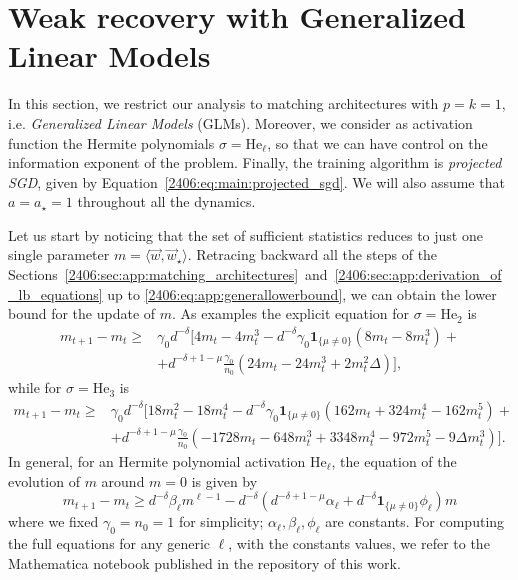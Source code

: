 \section{Weak recovery with Generalized Linear Models} \label{2406:app:sec:weakrecoveryglm}
In this section, we restrict our analysis to matching architectures with \(p=k=1\), i.e. \emph{Generalized Linear Models} (GLMs). Moreover, we consider as activation function the Hermite polynomials \(\sigma = \text{He}_\ell\), so that we can have control on the information exponent of the problem.
Finally, the training algorithm is \emph{projected SGD}, given by Equation~\eqref{2406:eq:main:projected_sgd}.
We will also assume that \(a=a_\star=1\) throughout all the dynamics.

Let us start by noticing that the set of sufficient statistics reduces to just one single parameter \(m=\langle\vec w,\vec w_\star\rangle\).
Retracing backward all the steps of the Sections~\ref{2406:sec:app:matching_architectures}~and~\ref{2406:sec:app:derivation_of_lb_equations} up to \eqref{2406:eq:app:generallowerbound}, we can obtain the lower bound for the update of \(m\). As examples the explicit equation for \(\sigma = \text{He}_2\) is
\[\begin{split}
    m_{t+1}-m_t \ge& \gamma_0 d^{-\delta}\Bigg[4m_t - 4m_t^3 - d^{-\delta}\gamma_0\mathbf{1}_{\{\mu\neq0\}}\left(8m_t-8m_t^3\right) +\\ 
        &+d^{-\delta+1-\mu}\frac{\gamma_0}{n_0}\left(24m_t-24m_t^3+2m_t^2\Delta\right)\Bigg],
\end{split}\]
while for \(\sigma = \text{He}_3\) is
\[\begin{split}
    m_{t+1}-m_t \ge& \gamma_0 d^{-\delta}\Bigg[18m_t^2 - 18m_t^4 - d^{-\delta}\gamma_0\mathbf{1}_{\{\mu\neq0\}}\left(162m_t + 324m_t^4 - 162m_t^5\right) +\\ 
&+d^{-\delta+1-\mu}\frac{\gamma_0}{n_0}\left(-1728m_t - 648m_t^3 + 3348m_t^4-972m_t^5-9\Delta m_t^3\right)\Bigg]. 
\end{split}\]
In general, for an Hermite polynomial activation \(\text{He}_\ell\), the equation of the evolution of \(m\) around \(m=0\) is given by
\begin{equation} \label{2406:eq:app:m_expansion}
    m_{t+1}-m_t \ge d^{-\delta}\beta_\ell m^{\ell-1} %
        -d^{-\delta} \left(d^{-\delta+1-\mu}\alpha_\ell + d^{-\delta}\mathbf{1}_{\{\mu\neq0\}}\phi_\ell   \right)m
\end{equation}
where we fixed \(\gamma_0=n_0=1\) for simplicity; \(\alpha_\ell, \beta_\ell, \phi_\ell\) are constants. For computing the full equations for any generic \(\ell\), with the constants values, we refer to the Mathematica notebook published in the repository of this work.


